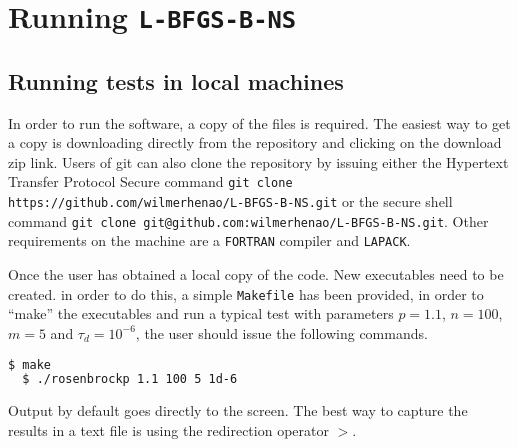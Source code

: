 
\chapter{Running \texttt{L-BFGS-B-NS}} %

\label{AppendixA} %



\section{Running tests in local machines}

In order to run the software, a copy of the files is required. The easiest way to get a copy is downloading directly from the repository \citep{lbfgsbNS} and clicking on the \textup{download zip} link. Users of git can also clone the repository by issuing either the Hypertext Transfer Protocol Secure command \texttt{git clone https://github.com/wilmerhenao/L-BFGS-B-NS.git} or the secure shell command \texttt{git clone git@github.com:wilmerhenao/L-BFGS-B-NS.git}. Other requirements on the machine are a \texttt{FORTRAN} compiler and \texttt{LAPACK}.

Once the user has obtained a local copy of the code. New executables need to be created. in order to do this, a simple \texttt{Makefile} has been provided, in order to ``make'' the executables and run a typical test with parameters $p = 1.1$, $n = 100$, $m = 5$ and $\tau_d = 10^{-6}$, the user should issue the following commands.

\begin{lstlisting}[language=bash]
  $ make
  $ ./rosenbrockp 1.1 100 5 1d-6
\end{lstlisting}

Output by default goes directly to the screen. The best way to capture the results in a text file is using the redirection operator $>$.

